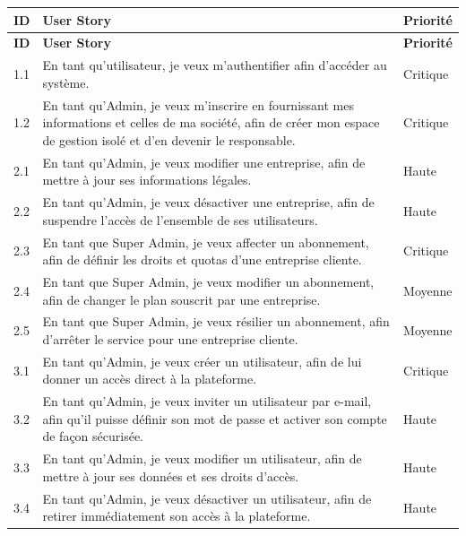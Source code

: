 \renewcommand{\arraystretch}{1.4}
\begin{small}
\begin{longtable}{|p{1.2cm}|p{9.5cm}|p{2.3cm}|}

\hline
\rowcolor[gray]{0.9}
\textbf{ID} & \textbf{User Story} & \textbf{Priorité} \\
\hline
\endfirsthead

\hline
\rowcolor[gray]{0.9}
\textbf{ID} & \textbf{User Story} & \textbf{Priorité} \\
\hline
\endhead

\hline
\endfoot
\endfoot

1.1 & En tant qu'utilisateur, je veux m'authentifier afin d'accéder au système. & Critique \\ \hline
1.2 & En tant qu'Admin, je veux m'inscrire en fournissant mes informations et celles de ma société, 
afin de créer mon espace de gestion isolé et d'en devenir le responsable. & Critique \\ \hline
2.1 & En tant qu'Admin, je veux modifier une entreprise, afin de mettre à jour ses informations 
légales. & Haute \\ \hline
2.2 & En tant qu'Admin, je veux désactiver une entreprise, afin de suspendre l'accès de l'ensemble 
de ses utilisateurs. & Haute \\ \hline
2.3 & En tant que Super Admin, je veux affecter un abonnement, afin de définir les droits et quotas 
d'une entreprise cliente. & Critique \\ \hline
2.4 & En tant que Super Admin, je veux modifier un abonnement, afin de changer le plan souscrit par 
une entreprise. & Moyenne \\ \hline
2.5 & En tant que Super Admin, je veux résilier un abonnement, afin d'arrêter le service pour une 
entreprise cliente. & Moyenne \\ \hline
3.1 & En tant qu'Admin, je veux créer un utilisateur, afin de lui donner un accès direct à la 
plateforme. & Critique \\ \hline
3.2 & En tant qu'Admin, je veux inviter un utilisateur par e-mail, afin qu'il puisse définir son 
mot de passe et activer son compte de façon sécurisée. & Haute \\ \hline
3.3 & En tant qu'Admin, je veux modifier un utilisateur, afin de mettre à jour ses données et ses 
droits d'accès. & Haute \\ \hline
3.4 & En tant qu'Admin, je veux désactiver un utilisateur, afin de retirer immédiatement son accès 
à la plateforme. & Haute \\ \hline

\end{longtable}
\end{small}
